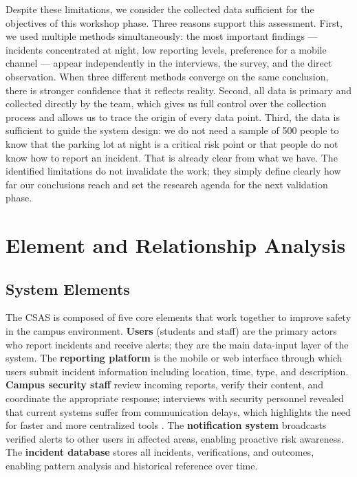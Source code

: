 \documentclass[12pt, onecolumn]{IEEEtran}
\begin{document}
Despite these limitations, we consider the collected data sufficient
for the objectives of this workshop phase. Three reasons support this
assessment. First, we used multiple methods simultaneously: the most
important findings --- incidents concentrated at night, low reporting
levels, preference for a mobile channel --- appear independently in the
interviews, the survey, and the direct observation. When three different
methods converge on the same conclusion, there is stronger confidence
that it reflects reality. Second, all data is primary and collected
directly by the team, which gives us full control over the collection
process and allows us to trace the origin of every data point. Third,
the data is sufficient to guide the system design: we do not need a
sample of 500 people to know that the parking lot at night is a critical
risk point or that people do not know how to report an incident. That is
already clear from what we have. The identified limitations do not
invalidate the work; they simply define clearly how far our conclusions
reach and set the research agenda for the next validation phase.

\section{Element and Relationship Analysis}

\subsection{System Elements}

The CSAS is composed of five core elements that work together to
improve safety in the campus environment. \textbf{Users} (students and
staff) are the primary actors who report incidents and receive alerts;
they are the main data-input layer of the system. The \textbf{reporting
platform} is the mobile or web interface through which users submit
incident information including location, time, type, and description.
\textbf{Campus security staff} review incoming reports, verify their
content, and coordinate the appropriate response; interviews with
security personnel revealed that current systems suffer from
communication delays, which highlights the need for faster and more
centralized tools \cite{sierra2026}. The \textbf{notification system}
broadcasts verified alerts to other users in affected areas, enabling
proactive risk awareness. The \textbf{incident database} stores all
incidents, verifications, and outcomes, enabling pattern analysis and
historical reference over time.
\end{document}
